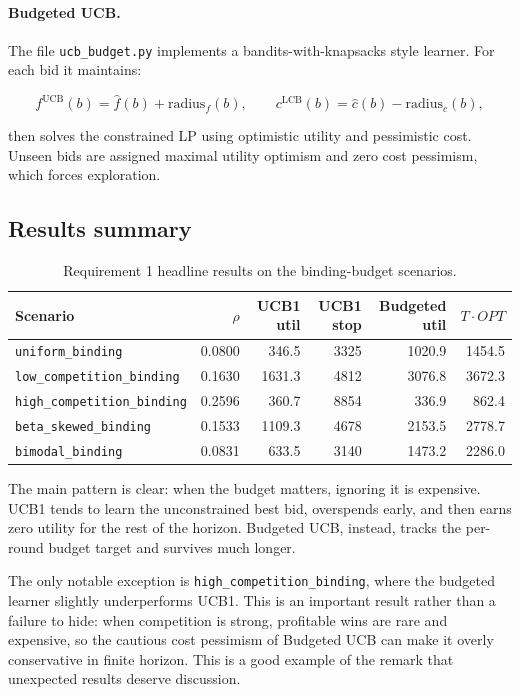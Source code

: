 \documentclass[11pt,a4paper]{article}
\begin{document}
\paragraph{Budgeted UCB.}
The file \texttt{ucb\_budget.py} implements a bandits-with-knapsacks style
learner. For each bid it maintains:

\[
f^{\text{UCB}}(b)=\hat f(b)+\text{radius}_f(b),
\qquad
c^{\text{LCB}}(b)=\hat c(b)-\text{radius}_c(b),
\]

then solves the constrained LP using optimistic utility and pessimistic cost.
Unseen bids are assigned maximal utility optimism and zero cost pessimism, which
forces exploration.

\subsection{Results summary}

\begin{table}[H]
\centering
\small
\begin{tabular}{lrrrrr}
\toprule
Scenario & $\rho$ & UCB1 util & UCB1 stop & Budgeted util & $T\cdot OPT$ \\
\midrule
\texttt{uniform\_binding} & 0.0800 & 346.5 & 3325 & 1020.9 & 1454.5 \\
\texttt{low\_competition\_binding} & 0.1630 & 1631.3 & 4812 & 3076.8 & 3672.3 \\
\texttt{high\_competition\_binding} & 0.2596 & 360.7 & 8854 & 336.9 & 862.4 \\
\texttt{beta\_skewed\_binding} & 0.1533 & 1109.3 & 4678 & 2153.5 & 2778.7 \\
\texttt{bimodal\_binding} & 0.0831 & 633.5 & 3140 & 1473.2 & 2286.0 \\
\bottomrule
\end{tabular}
\caption{Requirement 1 headline results on the binding-budget scenarios.}
\end{table}

The main pattern is clear: when the budget matters, ignoring it is expensive.
UCB1 tends to learn the unconstrained best bid, overspends early, and then earns
zero utility for the rest of the horizon. Budgeted UCB, instead, tracks the
per-round budget target and survives much longer.

The only notable exception is \texttt{high\_competition\_binding}, where the
budgeted learner slightly underperforms UCB1. This is an important result rather
than a failure to hide: when competition is strong, profitable wins are rare and
expensive, so the cautious cost pessimism of Budgeted UCB can make it overly
conservative in finite horizon. This is a good example of the remark
that unexpected results deserve discussion.
\end{document}
